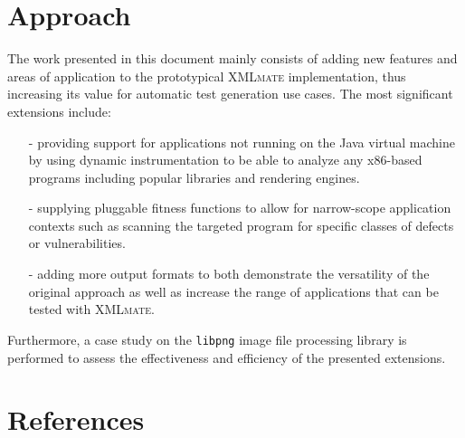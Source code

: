 \documentclass[a4paper,parskip=half,twoside=semi]{scrartcl}
\newcommand{\java}{Java\xspace}
\newcommand{\xmlmate}{\textsc{XMLmate}\xspace}
\newcommand{\libpng}{\texttt{libpng}\xspace}
\begin{document}

\newpage

\newpage

\cleardoublepage

\newpage
{} %
\setcounter{page}{6} %
\tableofcontents
\newpage

\cleardoublepage

\cleardoublepage
\section{Approach}
\label{sec:approach}
The work presented in this document mainly consists of adding new features and areas of application to the
prototypical \xmlmate implementation, thus increasing its value for automatic test generation use cases. The
most significant extensions include: 
\begin{itemize}
\item[-]providing support for applications not running on the \java virtual machine by using dynamic 
instrumentation to be able to analyze any x86-based programs including popular libraries and rendering
engines.
\item[-]supplying pluggable fitness functions to allow for narrow-scope application contexts such
as scanning the targeted program for specific classes of defects or vulnerabilities.
\item[-]adding more output formats to both demonstrate the versatility of the original approach as well as
increase the range of applications that can be tested with \xmlmate.
\end{itemize}

Furthermore, a case study on the \libpng image file processing library is performed to assess the
effectiveness and efficiency of the presented extensions.





\cleardoublepage

\cleardoublepage

\newpage

\cleardoublepage
\section*{References}
\renewcommand\refname{}


\end{document}
